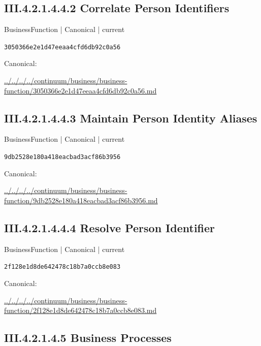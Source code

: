 \documentclass[10pt,a4paper]{article}
\begin{document}
\subsection*{III.4.2.1.4.4.2 Correlate Person Identifiers}
\label{element-3050366e2e1d47eeaa4cfd6db92c0a56}
{\small BusinessFunction | Canonical | current}\par
\texttt{3050366e2e1d47eeaa4cfd6db92c0a56}\par
Canonical: \par
{\footnotesize\url{../../../../continuum/business/business-function/3050366e2e1d47eeaa4cfd6db92c0a56.md}}\par
\subsection*{III.4.2.1.4.4.3 Maintain Person Identity Aliases}
\label{element-9db2528e180a418eacbad3acf86b3956}
{\small BusinessFunction | Canonical | current}\par
\texttt{9db2528e180a418eacbad3acf86b3956}\par
Canonical: \par
{\footnotesize\url{../../../../continuum/business/business-function/9db2528e180a418eacbad3acf86b3956.md}}\par
\subsection*{III.4.2.1.4.4.4 Resolve Person Identifier}
\label{element-2f128e1d8de642478c18b7a0ccb8e083}
{\small BusinessFunction | Canonical | current}\par
\texttt{2f128e1d8de642478c18b7a0ccb8e083}\par
Canonical: \par
{\footnotesize\url{../../../../continuum/business/business-function/2f128e1d8de642478c18b7a0ccb8e083.md}}\par
\subsection*{III.4.2.1.4.5 Business Processes}
\end{document}
